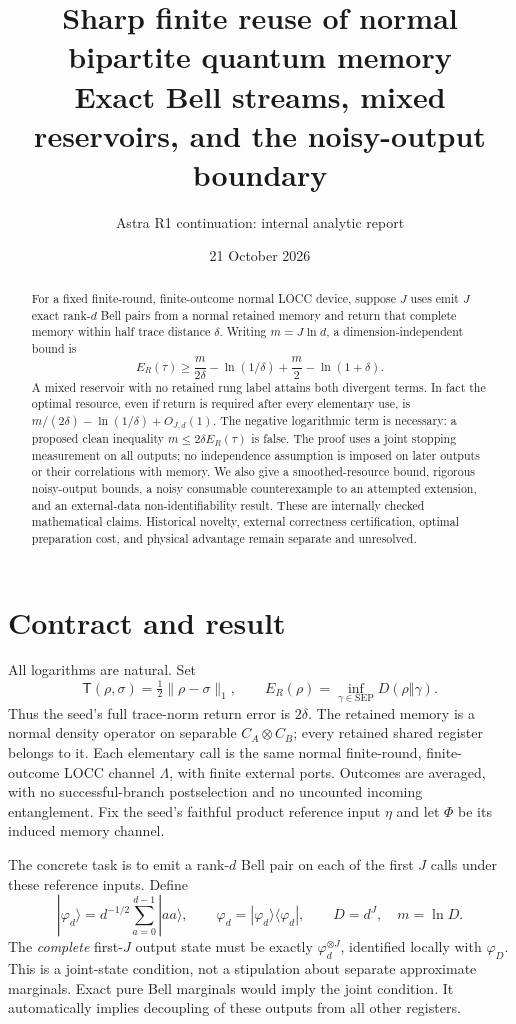 \documentclass[11pt,a4paper]{article}
\title{Sharp finite reuse of normal bipartite quantum memory\\
\large Exact Bell streams, mixed reservoirs, and the noisy-output boundary}
\author{Astra R1 continuation: internal analytic report}
\date{21 October 2026}
\newcommand{\ER}{E_R}
\newcommand{\SEP}{\mathrm{SEP}}
\newcommand{\dist}{\mathsf T}
\newcommand{\ph}{\varphi}
\begin{document}
\maketitle
\begin{abstract}
For a fixed finite-round, finite-outcome normal LOCC device, suppose \(J\) uses
emit \(J\) exact rank-\(d\) Bell pairs from a normal retained memory and return
that complete memory within half trace distance \(\delta\).
Writing \(m=J\ln d\), a dimension-independent bound is
\[
 \ER(\tau)\ge \frac{m}{2\delta}-\ln(1/\delta)
       +\frac m2-\ln(1+\delta).
\]
A mixed reservoir with no retained rung label attains both divergent terms.
In fact the optimal resource, even if return is required after every
elementary use, is \(m/(2\delta)-\ln(1/\delta)+O_{J,d}(1)\).
The negative logarithmic term is necessary: a proposed clean inequality
\(m\le 2\delta\ER(\tau)\) is false.
The proof uses a joint stopping measurement on all outputs; no independence
assumption is imposed on later outputs or their correlations with memory.
We also give a smoothed-resource bound, rigorous noisy-output bounds, a noisy
consumable counterexample to an attempted extension, and an external-data
non-identifiability result.
These are internally checked mathematical claims. Historical novelty,
external correctness certification, optimal preparation cost, and physical
advantage remain separate and unresolved.
\end{abstract}

\section{Contract and result}
All logarithms are natural. Set
\[
 \dist(\rho,\sigma)=\tfrac12\|\rho-\sigma\|_1,\qquad
 \ER(\rho)=\inf_{\gamma\in\SEP}D(\rho\Vert\gamma).
\]
Thus the seed's full trace-norm return error is \(2\delta\).
The retained memory is a normal density operator on separable
\(C_A\otimes C_B\); every retained shared register belongs to it.
Each elementary call is the same normal finite-round, finite-outcome LOCC
channel \(\Lambda\), with finite external ports. Outcomes are averaged, with
no successful-branch postselection and no uncounted incoming entanglement.
Fix the seed's faithful product reference input \(\eta\) and let \(\Phi\)
be its induced memory channel.

The concrete task is to emit a rank-\(d\) Bell pair on each of the first
\(J\) calls under these reference inputs. Define
\[
 |\ph_d\rangle=d^{-1/2}\sum_{a=0}^{d-1}|aa\rangle,\qquad
 \ph_d=|\ph_d\rangle\langle\ph_d|,\qquad D=d^J,\quad m=\ln D.
\]
The \emph{complete} first-\(J\) output state must be exactly
\(\ph_d^{\otimes J}\), identified locally with \(\ph_D\).
This is a joint-state condition, not a stipulation about separate approximate
marginals. Exact pure Bell marginals would imply the joint condition.
It automatically implies decoupling of these outputs from all other registers.
\end{document}
